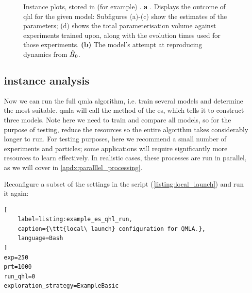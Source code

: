 \begin{figure}[H]
    \begin{center}
    \qquad
    \end{center}
    \caption[ Instance plots]{
        Instance plots, stored in (for example) . 
        \textbf{a} . 
        Displays the outcome of \gls{qhl} for the given model:
        Subfigures (a)-(c) show the estimates of the parameters; 
        (d) shows the total parameterisation volume against experiments trained upon, 
        along with the evolution times used for those experiments. 
        \textbf{(b)}  The model's attempt at reproducing dynamics from $\hat{H}_0$. 
    }
    \label{fig:model_analysis}
\end{figure}

\subsection{\Gls{instance} analysis}
Now we can run the full \gls{qmla} algorithm, i.e. train several models 
    and determine the most suitable. 
\gls{qmla} will call the  method of the  \gls{es}, 
    which tells it to construct three models. 
Note here we need to train and compare all models, so for the purpose of testing, 
    reduce the resources so the entire algorithm takes considerably longer to run. 
For testing purposes, here we recommend a small number of experiments and particles;
    some applications will require significantly more resources to learn effectively.
In realistic cases, these processes are run in parallel, as we will cover in \cref{apdx:paralllel_processing}.
\par 

Reconfigure a subset of the settings in the  script (\cref{listing:local_launch}) and run it again:
\begin{lstlisting}[
    label=listing:example_es_qhl_run,
    caption={\ttt{local\_launch} configuration for QMLA.},
    language=Bash
]
exp=250
prt=1000
run_qhl=0
exploration_strategy=ExampleBasic
\end{lstlisting}

